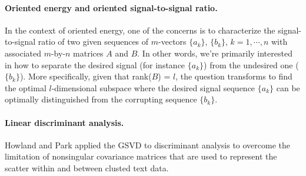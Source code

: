 \paragraph{Oriented energy and oriented signal-to-signal ratio.}
In the context of oriented energy, one of the concerns is to characterize the signal-to-signal ratio of two given sequences of $m$-vectors $\{a_k\}$, $\{b_k\}$, $k = 1,\cdots,n$ with associated $m$-by-$n$ matrices $A$ and $B$. \cite{de1988mathematical} In other words, we're primarily interested in how to separate the desired signal (for instance $\{a_k\}$) from the undesired one ($\{b_k\}$). More specifically, given that rank($B$) = $l$, the question transforms to find the optimal $l$-dimensional subspace where the desired signal sequence $\{a_k\}$ can be optimally distinguished from the corrupting sequence $\{b_k\}$.

%

\paragraph{Linear discriminant analysis.}
Howland and Park \cite{howland2003structure} \cite{kim2005dimension} applied the GSVD to discriminant analysis to overcome the limitation of nonsingular covariance matrices that are used to represent the scatter within and between clusted text data. 

